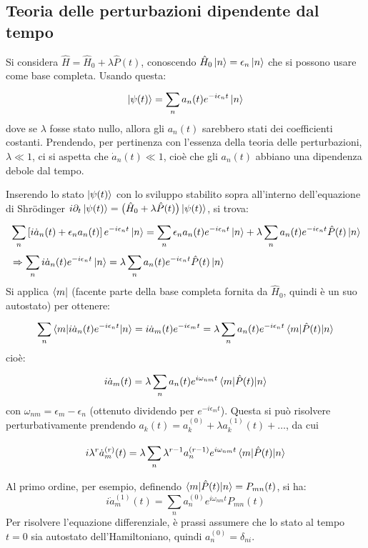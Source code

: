\documentclass[11pt, a4paper]{scrartcl} %
\numberwithin{equation}{subsection}
\theoremstyle{style2}
\theoremstyle{style1}
\newenvironment{boxenv}[1][]{
    \begin{eqbox}[#1]
    }{
   \end{eqbox}
}
\begin{document}
\subsection{Teoria delle perturbazioni dipendente dal tempo}
Si considera $\hat{H} = \hat{H}_0 + \lambda \hat{P}(t)$, conoscendo $\hat{H}_0 \ket{n} = \epsilon _n \ket{n} $ che si possono usare come base completa.
Usando questa:
\[
\ket{\psi (t)} = \sum_{n}^{} a_n(t) e^{-i \epsilon _n t} \ket{n} 
\] 
dove se $\lambda $ fosse stato nullo, allora gli $a_n(t) $ sarebbero stati dei coefficienti costanti.
Prendendo, per pertinenza con l'essenza della teoria delle perturbazioni, $\lambda \ll 1$, ci si aspetta che $\dot{a}_n(t) \ll 1$, cio\`e che gli $a_n(t)$ abbiano una dipendenza debole dal tempo.

Inserendo lo stato $\ket{\psi (t)} $ con lo sviluppo stabilito sopra all'interno dell'equazione di Shr\"odinger $i \partial _t \ket{\psi (t)} = \big(\hat{H}_0 + \lambda \hat{P}(t)\big) \ket{\psi (t)} $, si trova:
\[
	\begin{split}
		&\sum_{n}^{} \left[ i \dot{a}_n(t) +\epsilon _n a_n(t) \right]  e^{-i \epsilon _n t} \ket{n} = \sum_{n}^{} \epsilon _n a_n(t) e^{-i \epsilon _n t} \ket{n} + \lambda \sum_{n}^{} a_n(t) e^{-i \epsilon _n  t} \hat{P}(t) \ket{n} \\
		&\Rightarrow \sum_{n}^{}  i \dot{a}_n(t) e^{-i \epsilon _n t} \ket{n} =\lambda \sum_{n}^{} a_n(t) e^{-i \epsilon _n  t} \hat{P}(t) \ket{n} 
	\end{split}
\] 
Si applica $\bra{m} $ (facente parte della base completa fornita da $\hat{H}_0$, quindi \`e un suo autostato) per ottenere:
\[
\sum_{n}^{} \braket{m|i\dot{a}_n(t) e^{-i \epsilon _n t}  |n} = i \dot{a}_m(t) e^{-i\epsilon _m t} =\lambda \sum_{n}^{} a_n(t) e^{-i \epsilon _n t} \braket{m|\hat{P}(t)|n} 
\] 
cio\`e:
\begin{equation}
	i \dot{a}_m(t) = \lambda \sum_{n}^{} a_n(t) e^{i\omega_{nm} t} \braket{m|\hat{P}(t)|n} 
\end{equation}
con $\omega_{nm } = \epsilon _m - \epsilon _n$ (ottenuto dividendo per $e^{-i\epsilon _m t} $).
Questa si pu\`o risolvere perturbativamente prendendo $a_k(t) = a_k^{(0)} + \lambda a_k^{(1)} (t) + \ldots$, da cui
\begin{boxenv}[]
	\begin{equation}\label{prtemp}
	i \lambda ^r \dot{a}_m^{(r)} (t) =  \lambda \sum_{n}^{} \lambda ^{r-1}  a_n^{(r-1)} e^{i \omega_{nm} t} \braket{m|\hat{P}(t)|n} 
\end{equation}
\end{boxenv}
\noindent Al primo ordine, per esempio, definendo $\braket{m|\hat{P}(t)|n} = P_{mn} (t)$, si ha:
\begin{equation}
	i \dot{a}_m^{(1)} (t) = \sum_{n}^{} a_n^{(0)} e^{i\omega_{nm} t} P_{mn} (t)
\end{equation}
Per risolvere l'equazione differenziale, \`e prassi assumere che lo stato al tempo $t=0$ sia autostato dell'Hamiltoniano, quindi $a_n^{(0)} = \delta _{ni} $.
\end{document}
